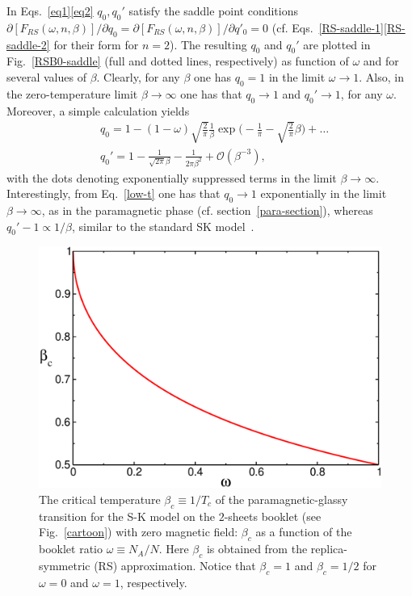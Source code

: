 \documentclass[twocolumn,superscriptaddress,prb,10pt]{revtex4-1}
\begin{document}
In Eqs.~\eqref{eq1}\eqref{eq2} $q_0,q_0'$ satisfy the saddle point conditions 
$\partial[F_{RS}(\omega,n,\beta)]/\partial q_0=\partial[F_{RS}(\omega,n,\beta)]/
\partial q'_0=0$ (cf. Eqs.~\eqref{RS-saddle-1}\eqref{RS-saddle-2} for their 
form for $n=2$). The resulting $q_0$ and $q_0'$ are plotted in Fig.~\ref{RSB0-saddle} 
(full and dotted lines, respectively) as function of $\omega$ and for several 
values of $\beta$. Clearly, for any $\beta$ one has $q_0=1$ in the limit 
$\omega\to 1$. Also, in the zero-temperature limit $\beta\to\infty$ one has 
that $q_0\to 1$ and $q_0'\to 1$, for any $\omega$. Moreover, a simple calculation 
yields  
%
\begin{align}
\label{low-t}
& q_0=1 -(1-\omega)\sqrt{\frac{2}{\pi}}\frac{1}{\beta}\exp\Big(-\frac{1}{\pi}-
\sqrt{\frac{2}{\pi}}\beta\Big)+\dots
\\ 
& q_0'=1-\frac{1}{\sqrt{2\pi}\beta}-\frac{1}{2\pi\beta^2}+{\mathcal O}(\beta^{-3}),
\end{align}
%
with the dots denoting exponentially suppressed terms in the limit $\beta\to\infty$. 
Interestingly, from Eq.~\eqref{low-t} one has that $q_0\to 1$ exponentially in the limit $\beta\to\infty$, 
as in the paramagnetic phase (cf. section~\ref{para-section}), whereas 
$q_0'-1\propto 1/\beta$, similar to the standard SK model~\cite{nishimori-book}. 


\begin{figure}[t]
\includegraphics*[width=0.9\linewidth]{./draft_figs/betac}
\caption{
 The critical temperature $\beta_c\equiv 1/T_c$ of the paramagnetic-glassy 
 transition for the S-K model on the $2$-sheets booklet (see Fig.~\ref{cartoon}) 
 with zero magnetic field: $\beta_c$ as a function of the booklet ratio $\omega
 \equiv N_A/N$. Here $\beta_c$  is obtained from the replica-symmetric (RS) 
 approximation. Notice that $\beta_c=1$ and $\beta_c=1/2$ for $\omega=0$ and 
 $\omega=1$, respectively. 
}
\label{beta_c}
\end{figure}
\end{document}
